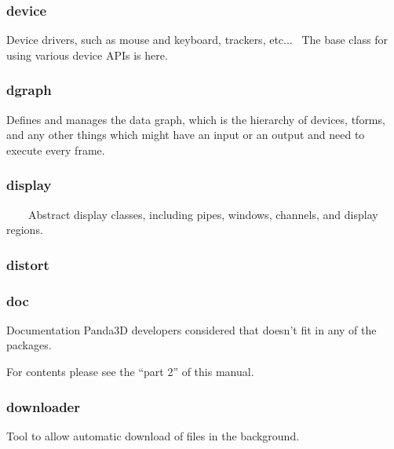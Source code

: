 \documentclass[a4paper]{article}
\begin{document}
\clearpage\subsubsection[device]{device}
\hypertarget{RefHeading21211167907073}{}{\color{black}
Device drivers, such as mouse and keyboard, trackers, etc... \ The base class for using various device APIs is here.}

\clearpage\subsubsection[dgraph]{dgraph}
\hypertarget{RefHeading21231167907073}{}{\color{black}
Defines and manages the data graph, which is the hierarchy of devices, tforms, and any other things which might have an
input or an output and need to execute every frame.}

\clearpage\subsubsection[display]{display}
\hypertarget{RefHeading21251167907073}{}{\color{black}
\ \ \ \ Abstract display classes, including pipes, windows, channels, and display regions.}

\clearpage\subsubsection[distort]{distort}
\hypertarget{RefHeading21271167907073}{}\subsubsection{}
\clearpage\subsubsection[doc]{doc}
\hypertarget{RefHeading21291167907073}{}{\color{black}
Documentation Panda3D developers considered that doesn't fit in any of the packages.}

{\color{black}
For contents please see the ``part 2'' of this manual.}

\clearpage
\bigskip

\clearpage\subsubsection[downloader]{downloader}
\hypertarget{RefHeading21311167907073}{}{\color{black}
Tool to allow automatic download of files in the background.}
\end{document}
